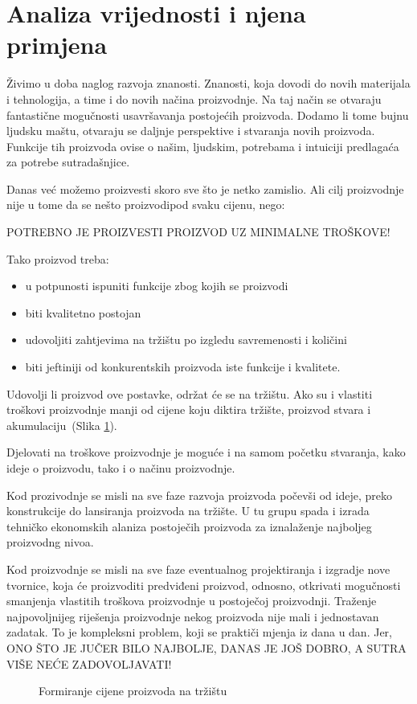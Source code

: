 \documentclass[a4paper,12pt]{article}
\numberwithin{figure}{section}
\begin{document}
\section*{Analiza vrijednosti i njena primjena}
Živimo u doba naglog razvoja znanosti. Znanosti, koja dovodi do novih materijala i tehnologija, a time i do novih načina proizvodnje. Na taj način se otvaraju fantastične mogučnosti usavršavanja postojećih proizvoda. Dodamo li tome bujnu ljudsku maštu, otvaraju se daljnje perspektive i stvaranja novih proizvoda. Funkcije tih proizvoda ovise o našim, ljudskim, potrebama i intuiciji predlagaća za potrebe sutradašnjice.\par
Danas već možemo proizvesti skoro sve što je netko zamislio. Ali cilj proizvodnje nije u tome da se nešto proizvodipod svaku cijenu, nego:
\begin{center}
POTREBNO JE PROIZVESTI PROIZVOD UZ MINIMALNE TROŠKOVE!
\end{center}
\noindent Tako proizvod treba:
\begin{itemize}
	\item u potpunosti ispuniti funkcije zbog kojih se proizvodi
	\item biti kvalitetno postojan
	\item udovoljiti zahtjevima na tržištu po izgledu savremenosti i količini
	\item biti jeftiniji od konkurentskih proizvoda iste funkcije i kvalitete.
\end{itemize}
\noindent Udovolji li proizvod ove postavke, održat će se na tržištu. Ako su i vlastiti troškovi proizvodnje manji od cijene koju diktira tržište, proizvod stvara i akumulaciju~(Slika \ref{Slika1}). \par
Djelovati na troškove proizvodnje je moguće i na samom početku stvaranja, kako ideje o proizvodu, tako i o načinu proizvodnje. \par
Kod prozivodnje se misli na sve faze razvoja proizvoda počevši od ideje, preko konstrukcije do lansiranja proizvoda na tržište. U tu grupu spada i izrada tehničko ekonomskih alaniza postoječih proizvoda za iznalaženje najboljeg proizvodng nivoa. \par
Kod proizvodnje se misli na sve faze eventualnog projektiranja i izgradje nove tvornice, koja će proizvoditi predviđeni proizvod, odnosno, otkrivati mogučnosti smanjenja vlastitih troškova proizvodnje u postoječoj proizvodnji. Traženje najpovoljnijeg riješenja proizvodnje nekog proizvoda nije mali i jednostavan zadatak. To je kompleksni problem, koji se praktiči mjenja iz dana u dan. Jer, ONO ŠTO JE JUČER BILO NAJBOLJE, DANAS JE JOŠ DOBRO, A SUTRA VIŠE NEĆE ZADOVOLJAVATI!

\begin{figure}
\centering
 
\caption{Formiranje cijene proizvoda na tržištu}\label{Slika1}
\end{figure}
\end{document}
